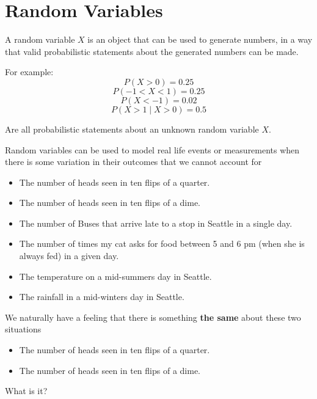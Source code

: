 \section{Random Variables}

\begin{frame}
A random variable $X$ is an object that can be used to generate numbers, in a way that valid probabilistic statements about the generated numbers can be made. 

\hfill

For example:
$$ P(X > 0) = 0.25 $$
$$ P(-1 < X < 1) = 0.25 $$
$$ P(X < -1) = 0.02 $$
$$ P(X > 1 \mid X > 0) = 0.5 $$

Are all probabilistic statements about an unknown random variable $X$.
\end{frame}
%

%
\begin{frame}
Random variables can be used to model real life events or measurements when
there is some variation in their outcomes that we cannot account for

\begin{itemize}
\item The number of heads seen in ten flips of a quarter.
\item The number of heads seen in ten flips of a dime.
\item The number of Buses that arrive late to a stop in Seattle in a single
day.
\item The number of times my cat asks for food between 5 and 6 pm (when she is
always fed) in a given day.
\item The temperature on a mid-summers day in Seattle.
\item The rainfall in a mid-winters day in Seattle.
\end{itemize}

\end{frame}
%

%
\begin{frame}
We naturally have a feeling that there is something \textbf{the same} about
these two situations

\begin{itemize}
\item The number of heads seen in ten flips of a quarter.
\item The number of heads seen in ten flips of a dime.
\end{itemize}

What is it?
\end{frame}
%

